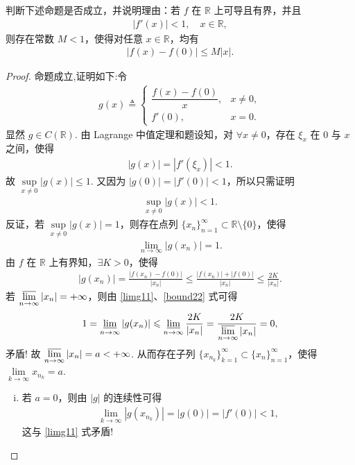 \documentclass[../../main.tex]{subfiles}%
\begin{document}
\begin{example}
判断下述命题是否成立，并说明理由：若 $f$ 在 $\mathbb{R}$ 上可导且有界，并且
\begin{align*}
|f'(x)| < 1, \quad x \in \mathbb{R},
\end{align*}
则存在常数 $M < 1$，使得对任意 $x \in \mathbb{R}$，均有
\begin{align*}
|f(x) - f(0)| \leqslant M|x|.
\end{align*}
\end{example}
\begin{proof}
命题成立,证明如下:令
\begin{align*}
g(x) \triangleq 
\begin{cases}
\dfrac{f(x)-f(0)}{x}, & x \ne 0, \\
f'(0), & x = 0.
\end{cases}
\end{align*}
显然 $g \in C(\mathbb{R})$. 由 Lagrange 中值定理和题设知，对 $\forall x \ne 0$，存在 $\xi_x$ 在 $0$ 与 $x$ 之间，使得
\begin{align*}
|g(x)| = |f'(\xi_x)| < 1.
\end{align*}
故 $\sup\limits_{x \ne 0} |g(x)| \leqslant 1$. 又因为 $|g(0)| = |f'(0)| < 1$，所以只需证明
\begin{align*}
\sup\limits_{x \ne 0} |g(x)| < 1.
\end{align*}
反证，若 $\sup\limits_{x \ne 0} |g(x)| = 1$，则存在点列 $\{x_n\}_{n=1}^{\infty} \subset \mathbb{R} \setminus \{0\}$，使得
\begin{align}
\lim_{n \to \infty} |g(x_n)| = 1. \label{limg11}
\end{align}
由 $f$ 在 $\mathbb{R}$ 上有界知，$\exists K > 0$，使得
\begin{align}
|g(x_n)| = \frac{|f(x_n) - f(0)|}{|x_n|} \leqslant \frac{|f(x_n)| + |f(0)|}{|x_n|} \leqslant \frac{2K}{|x_n|}. \label{bound22}
\end{align}
若 $\varlimsup\limits_{n \to \infty} |x_n| = +\infty$，则由 \eqref{limg11}、\eqref{bound22} 式可得
\begin{align*}
1 = \varliminf_{n \to \infty} |g(x_n)| \leqslant \varliminf_{n \to \infty} \frac{2K}{|x_n|} = \frac{2K}{\varlimsup\limits_{n \to \infty} |x_n|} = 0,
\end{align*}
矛盾! 故 $\varlimsup\limits_{n \to \infty} |x_n| = a < +\infty$. 从而存在子列 $\{x_{n_k}\}_{k=1}^{\infty} \subset \{x_n\}_{n=1}^{\infty}$，使得 $\lim\limits_{k \to \infty} x_{n_k} = a$.
\begin{enumerate}[(i)]
\item 若 $a = 0$，则由 $|g|$ 的连续性可得
\begin{align*}
\lim_{k \to \infty} |g(x_{n_k})| = |g(0)| = |f'(0)| < 1,
\end{align*}
这与 \eqref{limg11} 式矛盾!


\end{enumerate}
\end{proof}
\end{document}
